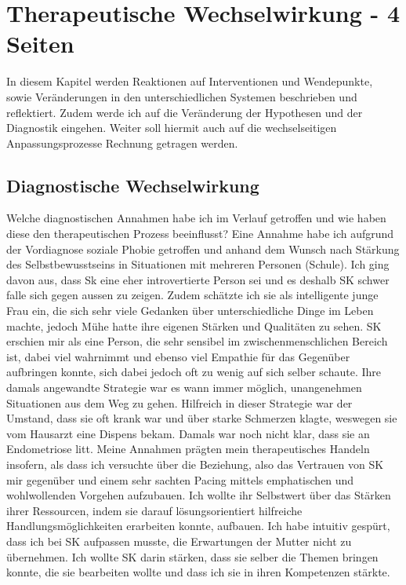\section{Therapeutische Wechselwirkung - 4 Seiten} \label{sec:TherapeutischeWechselwirkung}
In diesem Kapitel werden Reaktionen auf Interventionen und Wendepunkte, sowie Veränderungen in den unterschiedlichen Systemen beschrieben und reflektiert. Zudem werde ich auf die Veränderung der Hypothesen und der Diagnostik eingehen. Weiter soll hiermit auch auf die wechselseitigen Anpassungsprozesse Rechnung getragen werden. 

\subsection{Diagnostische Wechselwirkung} \label{sc:diagnostischeWechselwirkung}
Welche diagnostischen Annahmen habe ich im Verlauf getroffen und wie haben diese den therapeutischen Prozess beeinflusst? Eine Annahme habe ich aufgrund der Vordiagnose soziale Phobie getroffen und anhand dem Wunsch nach Stärkung des Selbstbewusstseins in Situationen mit mehreren Personen (Schule). Ich ging davon aus, dass Sk eine eher introvertierte Person sei und es deshalb SK schwer falle sich gegen aussen zu zeigen. Zudem schätzte ich sie als intelligente junge Frau ein, die sich sehr viele Gedanken über unterschiedliche Dinge im Leben machte, jedoch Mühe hatte ihre eigenen Stärken und Qualitäten zu sehen. SK erschien mir als eine Person, die sehr sensibel im zwischenmenschlichen Bereich ist, dabei viel wahrnimmt und ebenso viel Empathie für das Gegenüber aufbringen konnte, sich dabei jedoch oft zu wenig auf sich selber schaute. Ihre damals angewandte Strategie war es wann immer möglich, unangenehmen Situationen aus dem Weg zu gehen. Hilfreich in dieser Strategie war der Umstand, dass sie oft krank war und über starke Schmerzen klagte, weswegen sie vom Hausarzt eine Dispens bekam. Damals war noch nicht klar, dass sie an Endometriose litt. Meine Annahmen prägten mein therapeutisches Handeln insofern, als dass ich versuchte über die Beziehung, also das Vertrauen von SK mir gegenüber und einem sehr sachten Pacing mittels emphatischen und wohlwollenden Vorgehen aufzubauen. Ich wollte ihr Selbstwert über das Stärken ihrer Ressourcen, indem sie darauf lösungsorientiert hilfreiche Handlungsmöglichkeiten erarbeiten konnte, aufbauen. Ich habe intuitiv gespürt, dass ich bei SK aufpassen musste, die Erwartungen der Mutter nicht zu übernehmen. Ich wollte SK darin stärken, dass sie selber die Themen bringen konnte, die sie bearbeiten wollte und dass ich sie in ihren Kompetenzen stärkte. 

